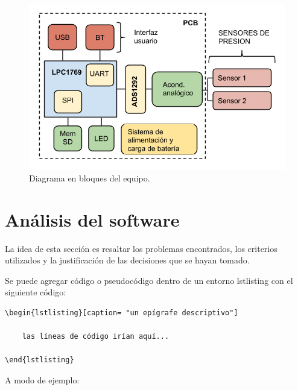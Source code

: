 \begin{figure}[!htbp]
	\centering
	\includegraphics[width=\textwidth]{./Figures/diag_bloques.png}
	\caption{Diagrama en bloques del equipo.}
	\label{fig:diag_bloques}
\end{figure}


\section{Análisis del software}
 
La idea de esta sección es resaltar los problemas encontrados, los criterios utilizados y la justificación de las decisiones que se hayan tomado.

Se puede agregar código o pseudocódigo dentro de un entorno lstlisting con el siguiente código:

\begin{verbatim}
\begin{lstlisting}[caption= "un epígrafe descriptivo"]

	las líneas de código irían aquí...
	
\end{lstlisting}
\end{verbatim}

A modo de ejemplo:

